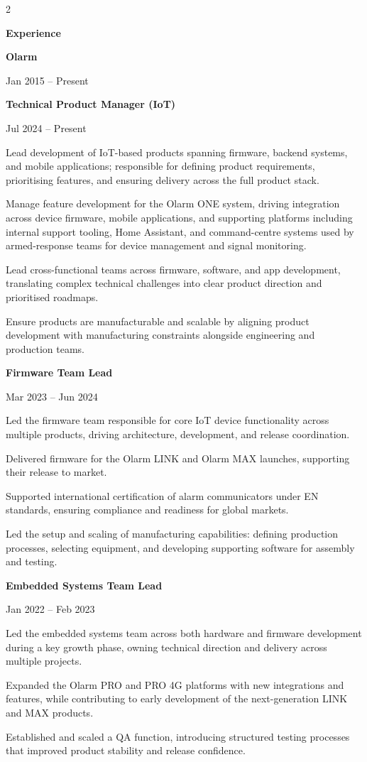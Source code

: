\documentclass[10pt]{article}
\newcommand{\mainsection}[1]{%
  \par\vspace{0.6em}%
  {\headingfont\bfseries\Large\color{headtext} #1}\par
  \vspace{2pt}{\color{headtext}\rule{\dimexpr\linewidth-\leftskip-\rightskip\relax}{1pt}}\par
  \vspace{0.4em}%
}
\newcommand{\titledate}[3][10em]{%
  \par\noindent
  \parbox[t]{\dimexpr\linewidth-\leftskip-\rightskip-#1-0.6em\relax}{\raggedright #2}%
  \hfill
  \parbox[t]{#1}{\raggedleft #3}%
  \par
}
\newcommand{\company}[3]{%
  \par\vspace{0.6em}%
  \titledate{\bfseries\large\color{headtext} #1}{\small\color{emeraldlt} #3}%
  \vspace{1pt}{\small\color{maintext}\itshape #2}\par
}
\newcommand{\subrole}[2]{%
  \par\vspace{0.3em}%
  \titledate{\bfseries\color{maintext} #1}{\small\color{emeraldlt} #2}%
  \vspace{0.1em}%
}
\begin{document}
\begin{paracol}{2}
\begin{rightcolumn}
\mainsection{Experience}

\company{Olarm}{Cape Town, South Africa \textbullet{} 9 yrs 5 mos}{Jan 2015 -- Present}

\subrole{Technical Product Manager (IoT)}{Jul 2024 -- Present}
\begin{duties}
  \item Lead development of IoT-based products spanning firmware, backend systems, and mobile applications; responsible for defining product requirements, prioritising features, and ensuring delivery across the full product stack.
  \item Manage feature development for the Olarm ONE system, driving integration across device firmware, mobile applications, and supporting platforms including internal support tooling, Home Assistant, and command-centre systems used by armed-response teams for device management and signal monitoring.
  \item Lead cross-functional teams across firmware, software, and app development, translating complex technical challenges into clear product direction and prioritised roadmaps.
  \item Ensure products are manufacturable and scalable by aligning product development with manufacturing constraints alongside engineering and production teams.
\end{duties}

\subrole{Firmware Team Lead}{Mar 2023 -- Jun 2024}
\begin{duties}
  \item Led the firmware team responsible for core IoT device functionality across multiple products, driving architecture, development, and release coordination.
  \item Delivered firmware for the Olarm LINK and Olarm MAX launches, supporting their release to market.
  \item Supported international certification of alarm communicators under EN standards, ensuring compliance and readiness for global markets.
  \item Led the setup and scaling of manufacturing capabilities: defining production processes, selecting equipment, and developing supporting software for assembly and testing.
\end{duties}

\subrole{Embedded Systems Team Lead}{Jan 2022 -- Feb 2023}
\begin{duties}
  \item Led the embedded systems team across both hardware and firmware development during a key growth phase, owning technical direction and delivery across multiple projects.
  \item Expanded the Olarm PRO and PRO 4G platforms with new integrations and features, while contributing to early development of the next-generation LINK and MAX products.
  \item Established and scaled a QA function, introducing structured testing processes that improved product stability and release confidence.
\end{duties}


\end{rightcolumn}
\end{paracol}
\end{document}
